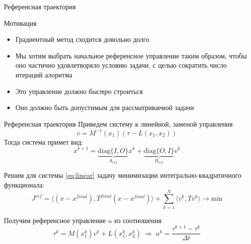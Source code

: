 \documentclass[16pt]{beamer}
\begin{document}
    \begin{frame}{Референсная траектория}
        \begin{block}{Мотивация}
            \begin{itemize}
                \item Градиентный метод сходится довольно долго
                \item Мы хотим выбрать начальное референсное управление таким образом, чтобы оно частично удовлетворяло условию задачи, с целью сократить число итераций алоритма
                \item Это управление должно \textit{быстро} строиться
                \item Оно должно быть допустимым для рассматриваемой задачи
            \end{itemize}
        \end{block}
    \end{frame}

    \begin{frame}{Референсная траектория}
        Приведем систему к линейной, заменой управления
        $$
            v = M^{-1}(x_1)(\tau - L(x_1, x_2))
        $$
        Тогда система примет вид:
        \begin{equation}\label{eq:linear}
            x^{k+1} =  \underbrace{\mathrm{diag}\{I,O\}}_{A_{ref}} x^{k} + \underbrace{\mathrm{diag}\{O, I\}}_{B_{ref}} v^{k}
        \end{equation}

        Решим для системы \eqref{eq:linear} задачу минимизации интегрально-квадратичного функционала:
        $$
            J^{ref} = \langle (x-x^{final}), T^{final}(x-x^{final}) \rangle + \sum_{k=1}^{N} \langle v^k, Tv^k \rangle \longrightarrow \mathrm{min}
        $$

        Получим референсное управление $u$ из соотношения
        $$
            \tau^k = M(x_1^k)v^k + L(x_1^k,x_2^k) \;\Longrightarrow\; u^{k} = \frac{\tau^{k+1} - \tau^{k}}{\Delta t}
        $$
    \end{frame}
\end{document}

